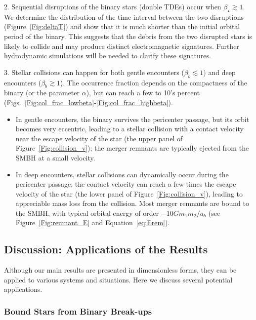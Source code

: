 \documentclass[twocolumn]{aastex631}
\begin{document}
2. Sequential disruptions of the binary stars (double TDEs) occur when $\beta_\star\gtrsim 1$.
We determine the distribution of the time interval between the two disruptions (Figure~\ref{Fig:deltaT}) and show that it is much shorter than the initial orbital period of the binary. 
This suggests that the debris from the two disrupted stars is likely to collide and may produce distinct electromagnetic signatures. 
Further hydrodynamic simulations will be needed to clarify these signatures.

3. Stellar collisions can happen for both gentle encounters ($\beta_b\lesssim 1$) and deep encounters ($\beta_b\gtrsim 1$). 
The occurrence fraction depends on the compactness of the binary (or the parameter $\alpha$), but can reach a few to 10's percent (Figs.~\ref{Fig:col_frac_lowbeta}-\ref{Fig:col_frac_highbeta}).
\begin{itemize}
\item In gentle encounters, the binary survives the pericenter passage, but its orbit becomes very eccentric, leading to a stellar collision with a contact velocity near the escape velocity of the star (the upper panel of Figure~\ref{Fig:collision_v}); 
the merger remnants are typically ejected from the SMBH at a small velocity.
\item In deep encounters, stellar collisions can dynamically occur during the pericenter passage; 
the contact velocity can reach a few times the escape velocity of the star (the lower panel of Figure~\ref{Fig:collision_v}), leading to appreciable mass loss from the collision. 
Most merger remnants are bound to the SMBH, with typical orbital energy of order $-10 Gm_1m_2/a_b$ (see Figure~\ref{Fig:remnant_E} and Equation~\ref{eq:Erem}).
\end{itemize}


\subsection{Discussion: Applications of the Results}
\label{sec:application}

Although our main results are presented in dimensionless forms, they can be applied to various systems and situations. 
Here we discuss several potential applications.


\subsubsection{Bound Stars from Binary Break-ups}
\label{sec:app_bound_stars}
\end{document}
